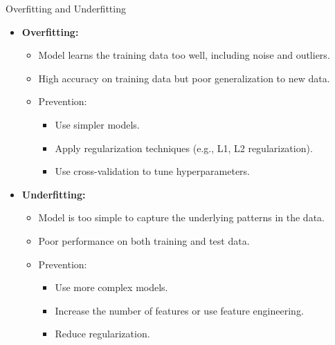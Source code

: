 \documentclass{beamer}
\begin{document}
\begin{frame}{Overfitting and Underfitting}
\begin{itemize}
    \item \textbf{Overfitting:}
    \begin{itemize}
        \item Model learns the training data too well, including noise and outliers.
        \item High accuracy on training data but poor generalization to new data.
        \item Prevention:
        \begin{itemize}
            \item Use simpler models.
            \item Apply regularization techniques (e.g., L1, L2 regularization).
            \item Use cross-validation to tune hyperparameters.
        \end{itemize}
    \end{itemize}
    \item \textbf{Underfitting:}
    \begin{itemize}
        \item Model is too simple to capture the underlying patterns in the data.
        \item Poor performance on both training and test data.
        \item Prevention:
        \begin{itemize}
            \item Use more complex models.
            \item Increase the number of features or use feature engineering.
            \item Reduce regularization.
        \end{itemize}
    \end{itemize}
\end{itemize}
\end{frame}
\end{document}
